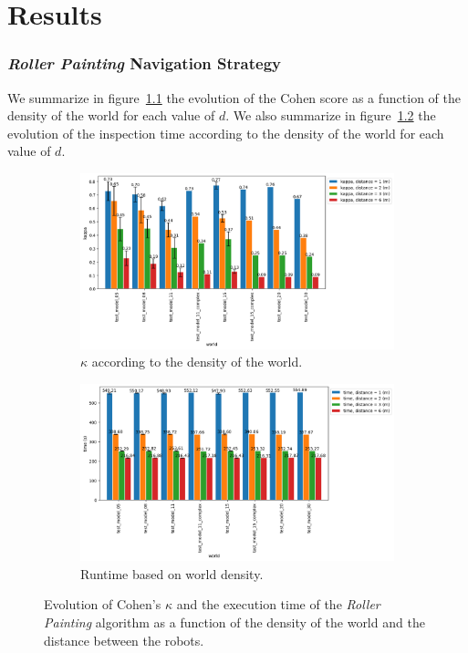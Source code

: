 
\chapter{Results}

\subsection*{\textit{Roller Painting} Navigation Strategy}

We summarize in figure~\ref{fig:peinture_au_rouleau-kappa_vs_world} the evolution of the Cohen score as a function of the density of the world for each value of $d$.
We also summarize in figure~\ref{fig:peinture_au_rouleau-time_vs_world} the evolution of the inspection time according to the density of the world for each value of $d$.

\begin{figure}[h!]
	\centering
	\begin{subfigure}[t]{0.9\linewidth}
		\includegraphics[width=\linewidth]{graphics/peinture_au_rouleau-kappa_vs_world_for_each_d.png}
		\caption{$\kappa$ according to the density of the world.}
		\label{fig:peinture_au_rouleau-kappa_vs_world}
	\end{subfigure}
	\hfill
	\begin{subfigure}[t]{0.9\linewidth}
			\includegraphics[width=\linewidth]{graphics/peinture_au_rouleau-time_vs_world_for_each_d.png}
			\caption{Runtime based on world density.}
			\label{fig:peinture_au_rouleau-time_vs_world}
	\end{subfigure}
	\caption{Evolution of Cohen's $\kappa$ and the execution time of the \textit{Roller Painting} algorithm as a function of the density of the world and the distance between the robots.}
	\label{fig:peinture_au_rouleau-world}
\end{figure}

